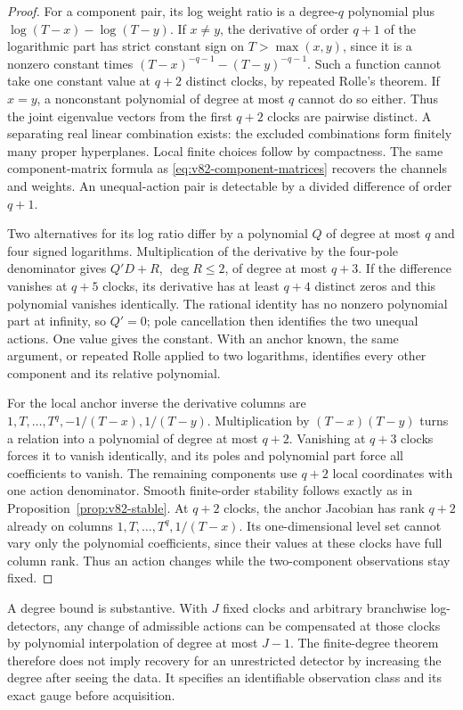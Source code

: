 \begin{proof}
For a component pair, its log weight ratio is a degree-$q$ polynomial
plus $\log(T-x)-\log(T-y)$. If $x\ne y$, the derivative of order
$q+1$ of the logarithmic part has strict constant sign on
$T>\max(x,y)$, since it is a nonzero constant times
$(T-x)^{-q-1}-(T-y)^{-q-1}$. Such a function cannot take one constant
value at $q+2$ distinct clocks, by repeated Rolle's theorem. If $x=y$,
a nonconstant polynomial of degree at most $q$ cannot do so either.
Thus the joint eigenvalue vectors from the first $q+2$ clocks are
pairwise distinct. A separating real linear combination exists: the
excluded combinations form finitely many proper hyperplanes. Local
finite choices follow by compactness. The same component-matrix formula
as \eqref{eq:v82-component-matrices} recovers the channels and weights.
An unequal-action pair is detectable by a divided difference of order
$q+1$.

Two alternatives for its log ratio differ by a polynomial $Q$ of degree
at most $q$ and four signed logarithms. Multiplication of the derivative
by the four-pole denominator gives $Q'D+R$, $\deg R\le2$, of degree
at most $q+3$. If the difference vanishes at $q+5$ clocks, its derivative
has at least $q+4$ distinct zeros and this polynomial vanishes identically.
The rational identity has no nonzero polynomial part at infinity, so
$Q'=0$; pole cancellation then identifies the two unequal actions.
One value gives the constant. With an anchor known, the same argument,
or repeated Rolle applied to two logarithms, identifies every other
component and its relative polynomial.

For the local anchor inverse the derivative columns are
$1,T,\ldots,T^q,-1/(T-x),1/(T-y)$. Multiplication by $(T-x)(T-y)$
turns a relation into a polynomial of degree at most $q+2$.
Vanishing at $q+3$ clocks forces it to vanish identically, and its poles
and polynomial part force all coefficients to vanish. The remaining
components use $q+2$ local coordinates with one action denominator.
Smooth finite-order stability follows exactly as in
Proposition~\ref{prop:v82-stable}. At $q+2$ clocks, the anchor Jacobian
has rank $q+2$ already on columns $1,T,\ldots,T^q,1/(T-x)$.
Its one-dimensional level set cannot vary only the polynomial
coefficients, since their values at these clocks have full column rank.
Thus an action changes while the two-component observations stay fixed.
\end{proof}

A degree bound is substantive. With $J$ fixed clocks and arbitrary
branchwise log-detectors, any change of admissible actions can be
compensated at those clocks by polynomial interpolation of degree at
most $J-1$. The finite-degree theorem therefore does not imply recovery
for an unrestricted detector by increasing the degree after seeing the
data. It specifies an identifiable observation class and its exact
gauge before acquisition.

